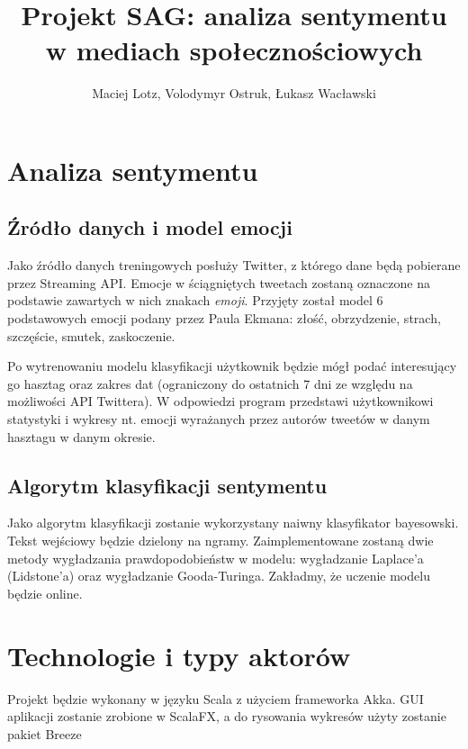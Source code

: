 \documentclass[12pt]{article}
\begin{document}
\title{Projekt SAG: analiza sentymentu w mediach społecznościowych}

\author{Maciej Lotz, Volodymyr Ostruk, Łukasz Wacławski}

\maketitle


\section{Analiza sentymentu}

\subsection{Źródło danych i model emocji}
Jako źródło danych treningowych posłuży Twitter, z którego dane będą pobierane przez Streaming API. Emocje w ściągniętych tweetach zostaną oznaczone na podstawie zawartych w nich znakach \emph{emoji}. Przyjęty został model 6 podstawowych emocji podany przez Paula Ekmana: złość, obrzydzenie, strach, szczęście, smutek, zaskoczenie.

Po wytrenowaniu modelu klasyfikacji użytkownik będzie mógł podać interesujący go hasztag oraz zakres dat (ograniczony do ostatnich 7 dni ze względu na możliwości API Twittera). W odpowiedzi program przedstawi użytkownikowi statystyki i wykresy nt. emocji wyrażanych przez autorów tweetów w danym hasztagu w danym okresie.

\subsection{Algorytm klasyfikacji sentymentu}
Jako algorytm klasyfikacji zostanie wykorzystany naiwny klasyfikator bayesowski. Tekst wejściowy będzie dzielony na ngramy. Zaimplementowane zostaną dwie metody wygładzania prawdopodobieństw w modelu: wygładzanie Laplace'a (Lidstone'a) oraz wygładzanie Gooda-Turinga. Zakładmy, że uczenie modelu będzie online.

\section{Technologie i typy aktorów}

Projekt będzie wykonany w języku Scala z użyciem frameworka Akka. GUI aplikacji zostanie zrobione w ScalaFX, a do rysowania wykresów użyty zostanie pakiet Breeze
\end{document}
